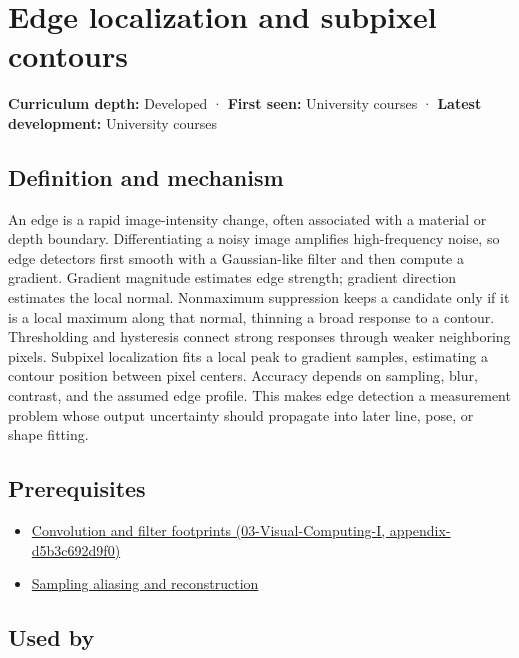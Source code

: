 \hypertarget{appendix-36022286b03e}{}
\section{Edge localization and subpixel contours}\label{appendix-36022286b03e-edge-localization-and-subpixel-contours}

\textbf{Curriculum depth:} Developed · \textbf{First seen:} University courses · \textbf{Latest development:} University courses

\subsection{Definition and mechanism}\label{appendix-36022286b03e-definition-and-mechanism}

An edge is a rapid image-intensity change, often associated with a material or depth boundary. Differentiating a noisy image amplifies high-frequency noise, so edge detectors first smooth with a Gaussian-like filter and then compute a gradient. Gradient magnitude estimates edge strength; gradient direction estimates the local normal. Nonmaximum suppression keeps a candidate only if it is a local maximum along that normal, thinning a broad response to a contour. Thresholding and hysteresis connect strong responses through weaker neighboring pixels. Subpixel localization fits a local peak to gradient samples, estimating a contour position between pixel centers. Accuracy depends on sampling, blur, contrast, and the assumed edge profile. This makes edge detection a measurement problem whose output uncertainty should propagate into later line, pose, or shape fitting.

\subsection{Prerequisites}\label{appendix-36022286b03e-prerequisites}

\begin{itemize}
\tightlist
\item
  \href{../03-Visual-Computing-I/main.pdf\#nameddest=appendix-d5b3c692d9f0}{Convolution and filter footprints (03-Visual-Computing-I, appendix-d5b3c692d9f0)}
\item
  \hyperref[appendix-6a7869dd79a6]{Sampling aliasing and reconstruction}
\end{itemize}

\subsection{Used by}\label{appendix-36022286b03e-used-by}

